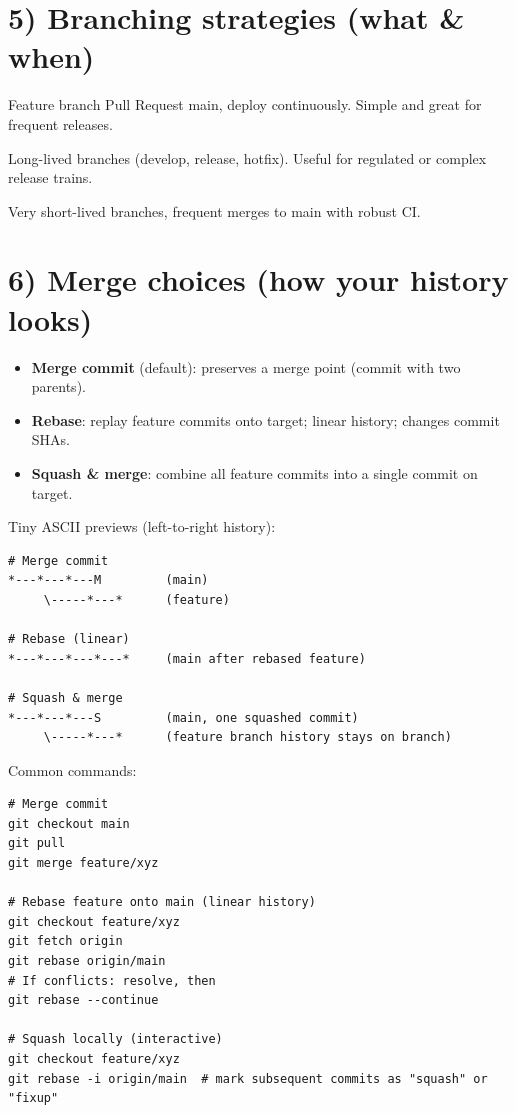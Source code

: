 \documentclass[11pt]{article}
\begin{document}
\section*{5) Branching strategies (what \& when)}
\begin{description}[leftmargin=1.25em,style=nextline]
  \item[GitHub Flow] Feature branch \textrightarrow{} Pull Request \textrightarrow{} main, deploy continuously. Simple and great for frequent releases.
  \item[Git Flow / Release branches] Long-lived branches (develop, release, hotfix). Useful for regulated or complex release trains.
  \item[Trunk-based] Very short-lived branches, frequent merges to main with robust CI.
\end{description}
\clearpage

\section*{6) Merge choices (how your history looks)}
\begin{itemize}
  \item \textbf{Merge commit} (default): preserves a merge point (commit with two parents).
  \item \textbf{Rebase}: replay feature commits onto target; linear history; changes commit SHAs.
  \item \textbf{Squash \& merge}: combine all feature commits into a single commit on target.
\end{itemize}

\noindent Tiny ASCII previews (left-to-right history):
\begin{verbatim}
# Merge commit
*---*---*---M         (main)
     \-----*---*      (feature)

# Rebase (linear)
*---*---*---*---*     (main after rebased feature)

# Squash & merge
*---*---*---S         (main, one squashed commit)
     \-----*---*      (feature branch history stays on branch)
\end{verbatim}

\noindent Common commands:
\begin{verbatim}
# Merge commit
git checkout main
git pull
git merge feature/xyz

# Rebase feature onto main (linear history)
git checkout feature/xyz
git fetch origin
git rebase origin/main
# If conflicts: resolve, then
git rebase --continue

# Squash locally (interactive)
git checkout feature/xyz
git rebase -i origin/main  # mark subsequent commits as "squash" or "fixup"
\end{verbatim}
\clearpage
\end{document}
